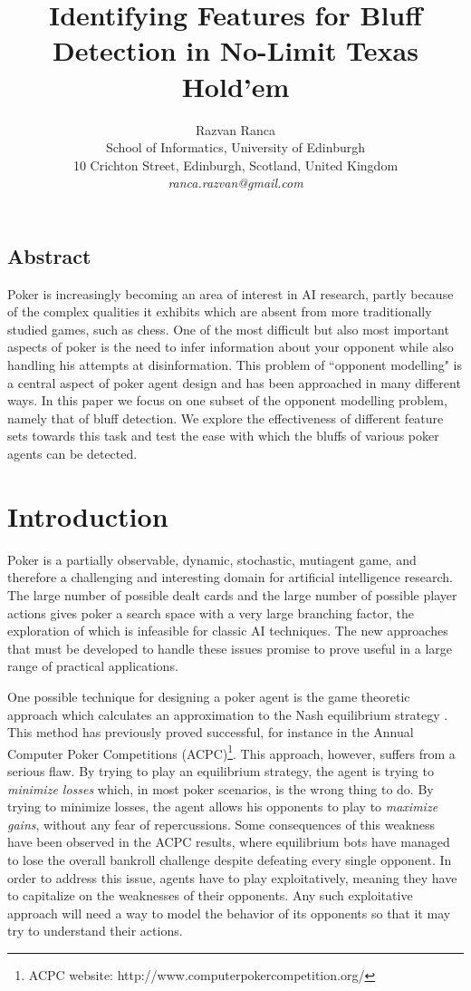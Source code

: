 \documentclass[letterpaper]{article}
\title{Identifying Features for Bluff Detection in No-Limit Texas Hold'em}
\author{Razvan Ranca\\
School of Informatics, University of Edinburgh\\
10 Crichton Street, Edinburgh, Scotland, United Kingdom\\
\emph{ranca.razvan@gmail.com}
}
\begin{document}
\maketitle

\begin{adjustwidth}{10pt}{10pt}
\section{
\fontsize{10pt}{12pt} 
\selectfont 
Abstract}
\fontsize{9pt}{10pt}
\selectfont
Poker is increasingly becoming an area of interest in AI research, partly because of the complex qualities it exhibits which are absent from more traditionally studied games, such as chess. One of the most difficult but also most important aspects of poker is the need to infer information about your opponent while also handling his attempts at disinformation. This problem of ``opponent modelling" is a central aspect of poker agent design and has been approached in many different ways. In this paper we focus on one subset of the opponent modelling problem, namely that of bluff detection. We explore the effectiveness of different feature sets towards this task and test the ease with which the bluffs of various poker agents can be detected.
\end{adjustwidth}

\section{
\fontsize{12pt}{15pt} 
\selectfont
Introduction}
\fontsize{10pt}{12pt} 
\selectfont
Poker is a partially observable, dynamic, stochastic, mutiagent game, and therefore a challenging and interesting domain for artificial intelligence research. The large number of possible dealt cards and the large number of possible player actions gives poker a search space with a very large branching factor, the exploration of which is infeasible for classic AI techniques. The new approaches that must be developed to handle these issues promise to prove useful in a large range of practical applications.

One possible technique for designing a poker agent is the game theoretic approach which calculates an approximation to the Nash equilibrium strategy \cite{P11,P12}. This method has previously proved successful, for instance in the Annual Computer Poker Competitions (ACPC)\footnote{ACPC website: http://www.computerpokercompetition.org/}. This approach, however, suffers from a serious flaw. By trying to play an equilibrium strategy, the agent is trying to \emph{minimize losses} which, in most poker scenarios, is the wrong thing to do. By trying to minimize losses, the agent allows his opponents to play to \emph{maximize gains}, without any fear of repercussions. Some consequences of this weakness have been observed in the ACPC results, where equilibrium bots have managed to lose the overall bankroll challenge despite defeating every single opponent. In order to address this issue, agents have to play exploitatively, meaning they have to capitalize on the weaknesses of their opponents. Any such exploitative approach will need a way to model the behavior of its opponents so that it may try to understand their actions.
\end{document}
